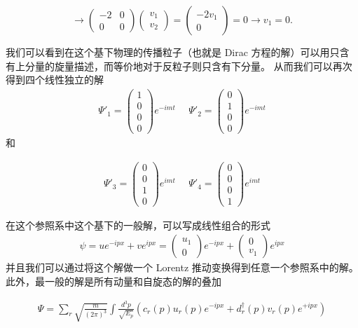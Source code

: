 \[\rightarrow\begin{pmatrix}-2&0\\0&0\end{pmatrix}\begin{pmatrix}v_1\\v_2\end{pmatrix}=\begin{pmatrix}-2v_1\\0\end{pmatrix}=0\rightarrow v_1=0.\]

我们可以看到在这个基下物理的传播粒子（也就是 Dirac 方程的解）可以用只含有上分量的旋量描述，而等价地对于反粒子则只含有下分量。
从而我们可以再次得到四个线性独立的解
\begin{align}
\Psi'_1=\begin{pmatrix}1\\0\\0\\0\end{pmatrix}e^{-imt}~~~~~~\Psi'_2=\begin{pmatrix}0\\1\\0\\0\end{pmatrix}e^{-imt}
\end{align}
和

\begin{align}
\Psi'_3=\begin{pmatrix}0\\0\\1\\0\end{pmatrix}e^{imt}~~~~~~\Psi'_4=\begin{pmatrix}0\\0\\0\\1\end{pmatrix}e^{imt}
\end{align}

在这个参照系中这个基下的一般解，可以写成线性组合的形式
\begin{align}
\psi=ue^{-ipx}+ve^{ipx}=\begin{pmatrix}u_1\\0\end{pmatrix}e^{-ipx}+\begin{pmatrix}0\\v_1\end{pmatrix}e^{ipx}
\end{align}
并且我们可以通过将这个解做一个 Lorentz 推动变换得到任意一个参照系中的解。
此外，最一般的解是所有动量和自旋态的解的叠加

\begin{align}
\Psi=\sum_r\sqrt{\frac{m}{(2\pi)^3}}\int\frac{d^3p}{\sqrt{E_p}}\left(c_r(p)u_r(p)e^{-ipx}+d^\dagger_r(p)v_r(p)e^{+ipx}\right)
\end{align}
